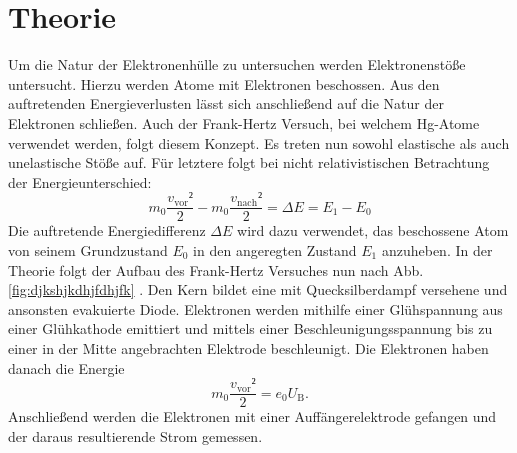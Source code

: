 
\section{Theorie}
\label{sec:Theorie}
Um die Natur der Elektronenhülle zu untersuchen werden Elektronenstöße untersucht.
Hierzu werden Atome mit Elektronen beschossen. Aus den auftretenden Energieverlusten
lässt sich anschließend auf die Natur der Elektronen schließen. Auch der Frank-Hertz
Versuch, bei welchem Hg-Atome verwendet werden,
folgt diesem Konzept. Es treten nun sowohl elastische als auch unelastische Stöße auf.
Für letztere folgt bei nicht relativistischen Betrachtung der Energieunterschied:
\begin{equation}
  m_0 \frac{v_\text{vor}²}{2} - m_0 \frac{v_\text{nach}²}{2} = \Delta E = E_1 - E_0
  \end{equation}
Die auftretende Energiedifferenz $\Delta E$ wird dazu verwendet, das beschossene
Atom von seinem Grundzustand $E_0$ in den angeregten Zustand $E_1$ anzuheben.
In der Theorie folgt der Aufbau des Frank-Hertz Versuches nun nach Abb.
\ref{fig:djkshjkdhjfdhjfk} . Den Kern bildet eine mit Quecksilberdampf versehene und ansonsten evakuierte
Diode. Elektronen werden mithilfe einer Glühspannung aus einer Glühkathode emittiert
und mittels einer Beschleunigungsspannung bis zu einer in der Mitte angebrachten
Elektrode beschleunigt. Die Elektronen haben danach die Energie
\begin{equation}
  m_0 \frac{v_\text{vor}²}{2} = e_0 U_\text{B}\text{.}
  \end{equation}
   Anschließend werden die Elektronen mit einer Auffängerelektrode
gefangen und der daraus resultierende Strom gemessen.
